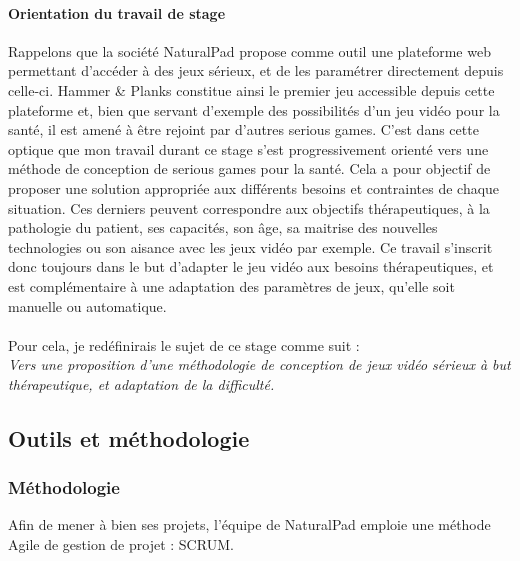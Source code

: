 	\paragraph{Orientation du travail de stage \\}
Rappelons que la société NaturalPad propose comme outil une plateforme web permettant d'accéder à des jeux sérieux, et de les paramétrer directement depuis celle-ci. Hammer \& Planks constitue ainsi le premier jeu accessible depuis cette plateforme et, bien que servant d'exemple des possibilités d'un jeu vidéo pour la santé, il est amené à être rejoint par d'autres serious games. C'est dans cette optique que mon travail durant ce stage s'est progressivement orienté vers une méthode de conception de serious games pour la santé. Cela a pour objectif de proposer une solution appropriée aux différents besoins et contraintes de chaque situation. Ces derniers peuvent correspondre aux objectifs thérapeutiques, à la pathologie du patient, ses capacités, son âge, sa maitrise des nouvelles technologies ou son aisance avec les jeux vidéo par exemple.
Ce travail s'inscrit donc toujours dans le but d'adapter le jeu vidéo aux besoins thérapeutiques, et est complémentaire à une adaptation des paramètres de jeux, qu'elle soit manuelle ou automatique.
 
\paragraph{}Pour cela, je redéfinirais le sujet de ce stage comme suit :\\
\textcolor{marron}{\emph{ {\large Vers une proposition d'une méthodologie de conception de jeux vidéo sérieux à but thérapeutique, et adaptation de la difficulté.}}}

\subsection{Outils et méthodologie}
	\subsubsection{Méthodologie}
Afin de mener à bien ses projets, l’équipe de NaturalPad emploie une méthode Agile de gestion de projet : SCRUM.

